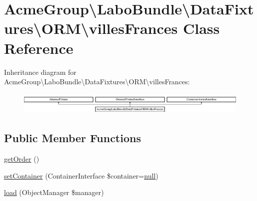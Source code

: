 \hypertarget{class_acme_group_1_1_labo_bundle_1_1_data_fixtures_1_1_o_r_m_1_1villes_frances}{\section{Acme\+Group\textbackslash{}Labo\+Bundle\textbackslash{}Data\+Fixtures\textbackslash{}O\+R\+M\textbackslash{}villes\+Frances Class Reference}
\label{class_acme_group_1_1_labo_bundle_1_1_data_fixtures_1_1_o_r_m_1_1villes_frances}
}
Inheritance diagram for Acme\+Group\textbackslash{}Labo\+Bundle\textbackslash{}Data\+Fixtures\textbackslash{}O\+R\+M\textbackslash{}villes\+Frances\+:\begin{figure}[H]
\begin{center}
\leavevmode
\includegraphics[height=1.078998cm]{class_acme_group_1_1_labo_bundle_1_1_data_fixtures_1_1_o_r_m_1_1villes_frances}
\end{center}
\end{figure}
\subsection*{Public Member Functions}
\begin{DoxyCompactItemize}
\item 
\hyperlink{class_acme_group_1_1_labo_bundle_1_1_data_fixtures_1_1_o_r_m_1_1villes_frances_a7cd8b54768e8b8107e990a488170b0b3}{get\+Order} ()
\item 
\hyperlink{class_acme_group_1_1_labo_bundle_1_1_data_fixtures_1_1_o_r_m_1_1villes_frances_ad84f25ca6b386e44a086c940c321a584}{set\+Container} (Container\+Interface \$container=\hyperlink{validate_8js_afb8e110345c45e74478894341ab6b28e}{null})
\item 
\hyperlink{class_acme_group_1_1_labo_bundle_1_1_data_fixtures_1_1_o_r_m_1_1villes_frances_ab0e035549f2d750030993c3de2d73f2e}{load} (Object\+Manager \$manager)
\end{DoxyCompactItemize}


